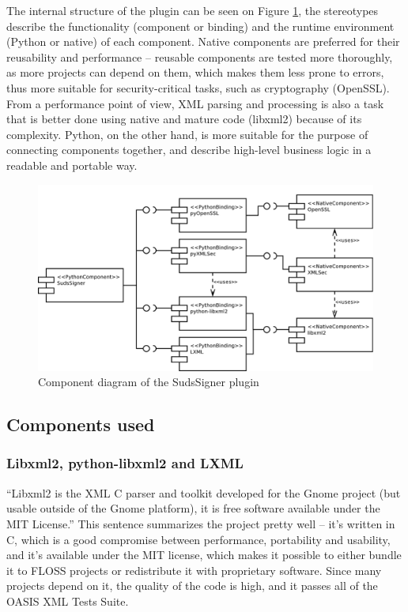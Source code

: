 The internal structure of the plugin can be seen on Figure \ref{fig:cmpdSudsSigner}, the stereotypes describe the functionality (component or binding) and the runtime environment (Python or native) of each component. Native components are preferred for their reusability and performance -- reusable components are tested more thoroughly, as more projects can depend on them, which makes them less prone to errors, thus more suitable for security-critical tasks, such as cryptography (OpenSSL). From a performance point of view, XML parsing and processing is also a task that is better done using native and mature code (libxml2) because of its complexity. Python, on the other hand, is more suitable for the purpose of connecting components together, and describe high-level business logic in a readable and portable way.

\begin{figure}[htbp]
 \centering
 \includegraphics[width=\textwidth]{images/cmpdSudsSigner.pdf}
 \caption{Component diagram of the SudsSigner plugin}
 \label{fig:cmpdSudsSigner}
\end{figure}

\subsection{Components used}

\subsubsection{Libxml2, python-libxml2 and LXML}

``Libxml2 is the XML C parser and toolkit developed for the Gnome project (but usable outside of the Gnome platform), it is free software available under the MIT License.''\cite{libxml2-homepage} This sentence summarizes the project pretty well -- it's written in C, which is a good compromise between performance, portability and usability, and it's available under the MIT license, which makes it possible to either bundle it to FLOSS projects or redistribute it with proprietary software. Since many projects depend on it, the quality of the code is high, and it passes all of the OASIS XML Tests Suite.

